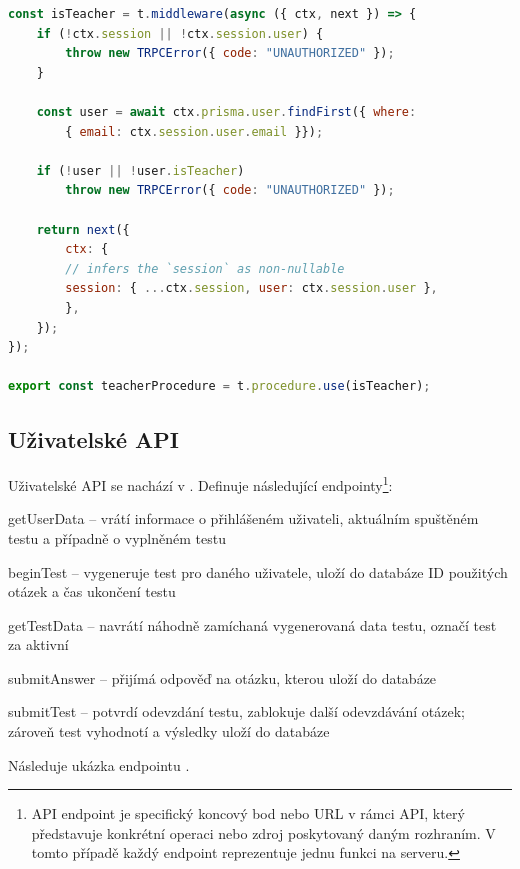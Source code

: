 \begin{lstlisting}[language=JavaScript,caption={Kontrola přístupu do učitelského rozhraní}]
const isTeacher = t.middleware(async ({ ctx, next }) => {
    if (!ctx.session || !ctx.session.user) {
        throw new TRPCError({ code: "UNAUTHORIZED" });
    }
    
    const user = await ctx.prisma.user.findFirst({ where: 
        { email: ctx.session.user.email }});

    if (!user || !user.isTeacher)
        throw new TRPCError({ code: "UNAUTHORIZED" });
    
    return next({
        ctx: {
        // infers the `session` as non-nullable
        session: { ...ctx.session, user: ctx.session.user },
        },
    });
});

export const teacherProcedure = t.procedure.use(isTeacher);
\end{lstlisting}

\subsection{Uživatelské API}
\label{userapi}

Uživatelské API se nachází v . Definuje následující endpointy\footnote{API endpoint je specifický koncový bod nebo URL v rámci API, který představuje konkrétní operaci nebo zdroj poskytovaný daným rozhraním. V tomto případě každý endpoint reprezentuje jednu funkci na serveru.}:

\begin{compactitem}
    \item getUserData -- vrátí informace o přihlášeném uživateli, aktuálním spuštěném testu a případně o vyplněném testu
    \item beginTest -- vygeneruje test pro daného uživatele, uloží do databáze ID použitých otázek a čas ukončení testu 
    \item getTestData -- navrátí náhodně zamíchaná vygenerovaná data testu, označí test za aktivní
    \item submitAnswer -- přijímá odpověď na otázku, kterou uloží do databáze
    \item submitTest -- potvrdí odevzdání testu, zablokuje další odevzdávání otázek; zároveň test vyhodnotí a výsledky uloží do databáze
\end{compactitem}

Následuje ukázka endpointu .

